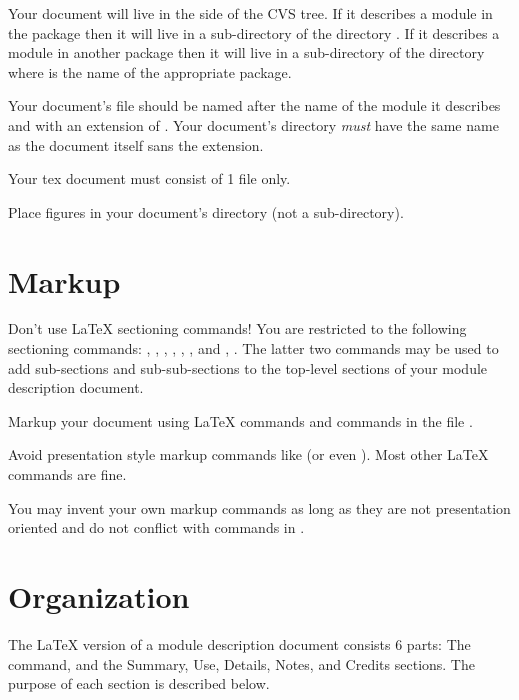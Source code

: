 \documentclass[11pt]{article}
\begin{document}
Your document will live in the  side of the CVS tree.  If it
describes a module in the \sr{} package then it will live in a
sub-directory of the directory .  If it
describes a module in another package then it will live in a sub-directory
of the directory  where
 is the name of the appropriate package.

Your document's file should be named after the name of the module it
describes and with an extension of .  Your document's
directory \emph{must} have the same name as the document itself sans the
 extension. 

Your tex document must consist of 1 file only.

Place figures in your document's directory (not a sub-directory).

\section{Markup}

Don't use \LaTeX{} sectioning commands!  You are restricted to the
following sectioning commands: ,
, ,
, ,
, and ,
.  The latter two commands may be used
to add sub-sections and sub-sub-sections to the top-level sections of your
module description document.  

Markup your document using \LaTeX{} commands and commands in the file
. 

Avoid presentation style markup commands like  (or even
).  Most other \LaTeX{} commands are fine.

You may invent your own markup commands as long as they are not
presentation oriented and do not conflict with commands in
.

\section{Organization}

The \LaTeX{} version of a module description document consists 6 parts: The
 command, and the Summary, Use, Details, Notes, and
Credits sections.  The purpose of each section is described below.
\end{document}
